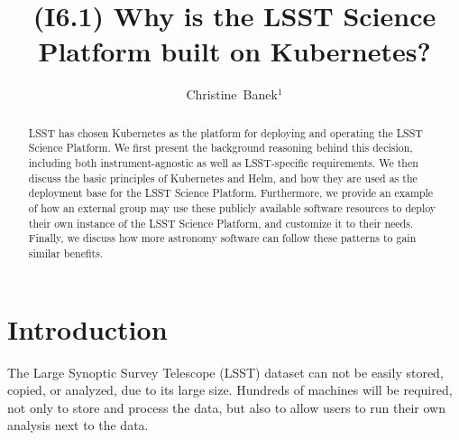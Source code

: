 \documentclass[11pt,twoside]{article}
\begin{document}
\title{(I6.1) Why is the LSST Science Platform built on Kubernetes?}


\author{Christine~Banek$^1$}





\newcommand{\code}[1]{\texttt{#1}}

\begin{abstract}
LSST has chosen Kubernetes as the platform for deploying and
operating the LSST Science Platform.  We first present the
background reasoning behind this decision, including both
instrument-agnostic as well as LSST-specific requirements.
We then discuss the basic principles of Kubernetes and Helm, and how
they are used as the deployment base for the LSST Science Platform.
Furthermore, we provide an example of how an external group may
use these publicly available software resources to deploy their own
instance of the LSST Science Platform, and customize it
to their needs.  Finally, we discuss how more astronomy software
can follow these patterns to gain similar benefits.
\end{abstract}

\section{Introduction}

The Large Synoptic Survey Telescope (LSST) dataset can not be easily stored,
copied, or analyzed, due to its large size.  Hundreds of machines will be
required, not only to store and process the data, but also to allow users
to run their own analysis next to the data.
\end{document}

